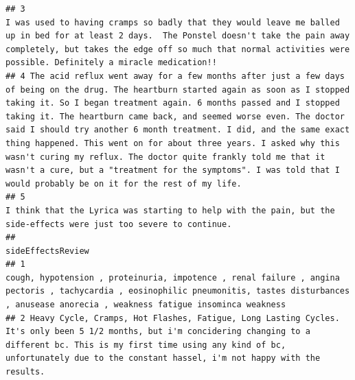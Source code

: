 \documentclass[spanish,]{article}
\begin{document}
\begin{verbatim}
## 3                                                                                                                                                                                                                                                                                                                                                         I was used to having cramps so badly that they would leave me balled up in bed for at least 2 days.  The Ponstel doesn't take the pain away completely, but takes the edge off so much that normal activities were possible. Definitely a miracle medication!!
## 4 The acid reflux went away for a few months after just a few days of being on the drug. The heartburn started again as soon as I stopped taking it. So I began treatment again. 6 months passed and I stopped taking it. The heartburn came back, and seemed worse even. The doctor said I should try another 6 month treatment. I did, and the same exact thing happened. This went on for about three years. I asked why this wasn't curing my reflux. The doctor quite frankly told me that it wasn't a cure, but a "treatment for the symptoms". I was told that I would probably be on it for the rest of my life.
## 5                                                                                                                                                                                                                                                                                                                                                                                                                                                                                                     I think that the Lyrica was starting to help with the pain, but the side-effects were just too severe to continue.
##                                                                                                                                                                                                                                                    sideEffectsReview
## 1                                                              cough, hypotension , proteinuria, impotence , renal failure , angina pectoris , tachycardia , eosinophilic pneumonitis, tastes disturbances , anusease anorecia , weakness fatigue insominca weakness
## 2 Heavy Cycle, Cramps, Hot Flashes, Fatigue, Long Lasting Cycles. It's only been 5 1/2 months, but i'm concidering changing to a different bc. This is my first time using any kind of bc, unfortunately due to the constant hassel, i'm not happy with the results.

\end{verbatim}
\end{document}
